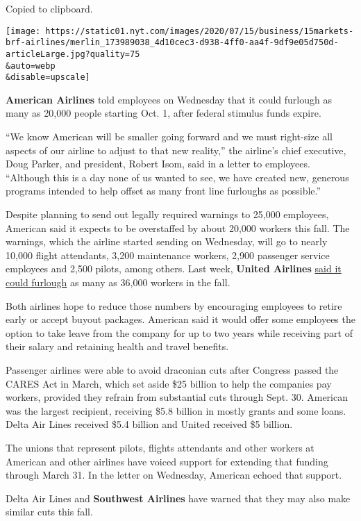 Copied to clipboard.

\texttt{[image: https://static01.nyt.com/images/2020/07/15/business/15markets-brf-airlines/merlin\_173989038\_4d10cec3-d938-4ff0-aa4f-9df9e05d750d-articleLarge.jpg?quality=75\\\&auto=webp\\\&disable=upscale]}

\textbf{American Airlines} told employees on Wednesday that it could
furlough as many as 20,000 people starting Oct. 1, after federal
stimulus funds expire.

``We know American will be smaller going forward and we must right-size
all aspects of our airline to adjust to that new reality,'' the
airline's chief executive, Doug Parker, and president, Robert Isom, said
in a letter to employees. ``Although this is a day none of us wanted to
see, we have created new, generous programs intended to help offset as
many front line furloughs as possible.''

Despite planning to send out legally required warnings to 25,000
employees, American said it expects to be overstaffed by about 20,000
workers this fall. The warnings, which the airline started sending on
Wednesday, will go to nearly 10,000 flight attendants, 3,200 maintenance
workers, 2,900 passenger service employees and 2,500 pilots, among
others. Last week, \textbf{United Airlines}
\href{https://www.nytimes.com/2020/07/08/business/united-airlines-furlough-36000.html}{said
it could furlough} as many as 36,000 workers in the fall.

Both airlines hope to reduce those numbers by encouraging employees to
retire early or accept buyout packages. American said it would offer
some employees the option to take leave from the company for up to two
years while receiving part of their salary and retaining health and
travel benefits.

Passenger airlines were able to avoid draconian cuts after Congress
passed the CARES Act in March, which set aside \$25 billion to help the
companies pay workers, provided they refrain from substantial cuts
through Sept. 30. American was the largest recipient, receiving \$5.8
billion in mostly grants and some loans. Delta Air Lines received \$5.4
billion and United received \$5 billion.

The unions that represent pilots, flights attendants and other workers
at American and other airlines have voiced support for extending that
funding through March 31. In the letter on Wednesday, American echoed
that support.

Delta Air Lines and \textbf{Southwest Airlines} have warned that they
may also make similar cuts this fall.

